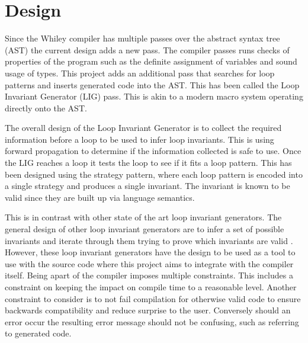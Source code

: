 \chapter{Design}\label{C:design}
%

Since the Whiley compiler has multiple passes over the abstract syntax tree
(AST)
the current design adds a new pass. The compiler passes runs checks of properties
of the program such as the definite assignment of variables and sound usage of
types. This project adds an additional pass that searches for loop patterns and
inserts generated code into the AST.
This has been called the Loop Invariant Generator (LIG) pass.
This is akin to a modern macro system operating directly onto the AST.

The overall design of the Loop Invariant Generator is to collect the required
information before a loop to be used to infer loop invariants.
This is using forward propagation to determine if the
information collected is safe to use. Once the LIG reaches a loop
it tests the loop to see if it fits a loop pattern. This has been
designed using the strategy pattern, where each loop pattern is encoded
into a single strategy and produces a single invariant.
The invariant is known to be valid since they are built up via language
semantics.

This is in contrast with other state of the art loop invariant generators.
The general design of other loop invariant generators are to infer a set
of possible invariants and iterate through them trying to prove which
invariants are valid \cite{infer-dynamic} \cite{infer-postconditions}.
However, these loop invariant generators have the design to be used as a tool
to use with the source code where this project aims to integrate with the
compiler itself. Being apart of the compiler imposes multiple constraints.
This includes a constraint on keeping the impact on compile time to a
reasonable level.
Another constraint to consider is to not fail compilation for otherwise valid
code to ensure backwards compatibility and reduce surprise to the user.
Conversely should an error occur the resulting error message should not be
confusing, such as referring to generated code.


